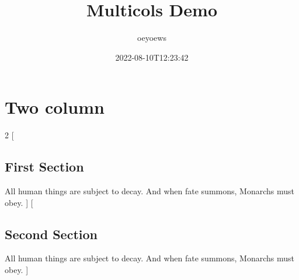 \documentclass{article}
\title{Multicols Demo}
\author{oeyoews}
\date{2022-08-10T12:23:42}
\begin{document}
\maketitle

\section{ Two column}%
\label{sec: Two column}

\begin{multicols}{2}
	[
		\subsection{First Section}
		All human things are subject to decay. And when fate summons, Monarchs must obey.
	]
	[
		\subsection{Second Section}
		All human things are subject to decay. And when fate summons, Monarchs must obey.
	]
\end{multicols}
\end{document}
